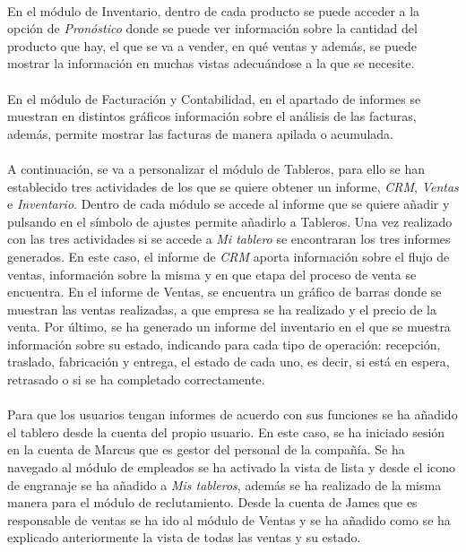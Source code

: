 \paragraph{}
En el módulo de Inventario, dentro de cada producto se puede acceder a la opción de \textit{Pronóstico} donde se puede ver información sobre la cantidad del producto que hay, el que se va a vender, en qué ventas y además, se puede mostrar la información en muchas vistas adecuándose a la que se necesite. 
\paragraph{}
En el módulo de Facturación y Contabilidad, en el apartado de informes se muestran en distintos gráficos información sobre el análisis de las facturas, además, permite mostrar las facturas de manera apilada o acumulada. 
\paragraph{}
A continuación, se va a personalizar el módulo de Tableros, para ello se han establecido tres actividades de los que se quiere obtener un informe, \textit{CRM}, \textit{Ventas} e \textit{Inventario}. Dentro de cada módulo se accede al informe que se quiere añadir y pulsando en el símbolo de ajustes permite añadirlo a Tableros. Una vez realizado con las tres actividades si se accede a \textit{Mi tablero} se encontraran los tres informes generados. En este caso, el informe de \textit{CRM} aporta información sobre el flujo de ventas, información sobre la misma y en que etapa del proceso de venta se encuentra. En el informe de Ventas, se encuentra un gráfico de barras donde se muestran las ventas realizadas, a que empresa se ha realizado y el precio de la venta. Por último, se ha generado un informe del inventario en el que se muestra información sobre su estado, indicando para cada tipo de operación: recepción, traslado, fabricación y entrega, el estado de cada uno, es decir, si está en espera, retrasado o si se ha completado correctamente.
\paragraph{}

Para que los usuarios tengan informes de acuerdo con sus funciones se ha añadido el tablero desde la cuenta del propio usuario. En este caso, se ha iniciado sesión en la cuenta de Marcus que es gestor del personal de la compañía. Se ha navegado al módulo de empleados se ha activado la vista de lista y desde el icono de engranaje se ha añadido a \textit{Mis tableros}, además se ha realizado de la misma manera para el módulo de reclutamiento. Desde la cuenta de James que es responsable de ventas se ha ido al módulo de Ventas y se ha añadido como se ha explicado anteriormente la vista de todas las ventas y su estado. 
